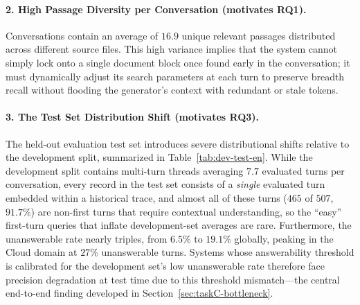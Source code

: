 \paragraph{2. High Passage Diversity per Conversation (motivates RQ1).}
Conversations contain an average of $16.9$ unique relevant passages distributed across different source files. This high variance implies that the system cannot simply lock onto a single document block once found early in the conversation; it must dynamically adjust its search parameters at each turn to preserve breadth recall without flooding the generator's context with redundant or stale tokens.

\paragraph{3. The Test Set Distribution Shift (motivates RQ3).}
The held-out evaluation test set introduces severe distributional shifts relative to the development split, summarized in Table~\ref{tab:dev-test-en}. While the development split contains multi-turn threads averaging $7.7$ evaluated turns per conversation, every record in the test set consists of a \textit{single} evaluated turn embedded within a historical trace, and almost all of these turns ($465$ of $507$, $91.7\%$) are non-first turns that require contextual understanding, so the ``easy'' first-turn queries that inflate development-set averages are rare. Furthermore, the unanswerable rate nearly triples, from $6.5\%$ to $19.1\%$ globally, peaking in the Cloud domain at $27\%$ unanswerable turns. Systems whose answerability threshold is calibrated for the development set's low unanswerable rate therefore face precision degradation at test time due to this threshold mismatch---the central end-to-end finding developed in Section~\ref{sec:taskC-bottleneck}.


